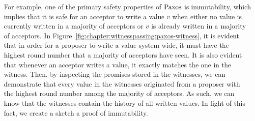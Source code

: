 For example, one of the primary safety properties of $\mathrm{Paxos}$ is immutability, 
which implies that it is safe for an acceptor to write a value $v$ when either no value is currently written in a majority of acceptors or $v$ is already written in a majority of acceptors. 
In Figure~\ref{fig:chapter:witnesspassing:paxos-witness}, it is evident that in order for a proposer to write a value system-wide, 
it must have the highest round number that a majority of acceptors have seen. 
It is also evident that whenever an acceptor writes a value, it exactly matches the one in the witness. 
Then, by inspecting the promises stored in the witnesses, we can demonstrate that every value in the witnesses originated from a proposer with the highest round number among the majority of acceptors. 
As such, we can know that the witnesses contain the history of all written values. In light of this fact, we create a sketch a proof of immutability.
